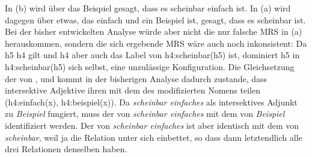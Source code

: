 \noindent
In (b) wird über das Beispiel gesagt, dass es scheinbar einfach ist. In (a) wird
dagegen über etwas, das einfach und ein Beispiel ist, gesagt, dass es scheinbar ist. Bei der bisher
entwickelten Analyse würde aber nicht die nur falsche MRS in (a) herauskommen, sondern die
sich ergebende MRS wäre auch noch inkonsistent:
\ea
{}
\z
Da h5 \qeq h4 gilt und h4 aber auch das Label von h4:scheinbar(h5) ist, dominiert h5 in h4:scheinbar(h5) sich
selbst, eine unzulässige Konfiguration. Die Gleichsetzung der \ltopwe von ,
 und  kommt in der bisherigen Analyse dadurch zustande, dass
intersektive Adjektive ihren \ltopw mit dem des modifizierten Nomens teilen (h4:einfach(x),
h4:beispiel(x)). Da \emph{scheinbar einfaches} als intersektives Adjunkt zu \emph{Beispiel} fungiert,
muss der \ltopw von \emph{scheinbar einfaches} mit dem von \emph{Beispiel} identifiziert werden. Der
\ltopw von \emph{scheinbar einfaches} ist aber identisch mit dem von \emph{scheinbar}, weil ja
 die Relation  unter sich einbettet, so dass dann
letztendlich alle drei Relationen denselben \ltopw haben.

